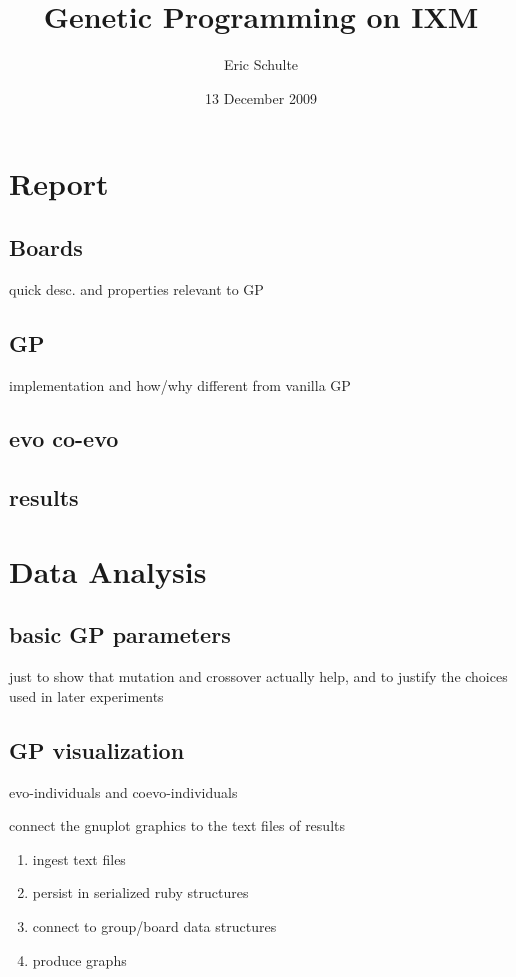 \documentclass[11pt]{article}
\title{Genetic Programming on IXM}
\author{Eric Schulte}
\date{13 December 2009}
\begin{document}
\maketitle


\section*{Report}
\label{sec-1}
\subsection*{Boards}
\label{sec-1.1}

quick desc. and properties relevant to GP
\subsection*{GP}
\label{sec-1.2}

implementation and how/why different from vanilla GP
\subsection*{evo co-evo}
\label{sec-1.3}
\subsection*{results}
\label{sec-1.4}
\section*{Data Analysis}
\label{sec-2}
\subsection*{basic GP parameters}
\label{sec-2.1}

just to show that mutation and crossover actually help, and to justify
the choices used in later experiments
\subsection*{GP visualization}
\label{sec-2.2}

evo-individuals and coevo-individuals

connect the gnuplot graphics to the text files of results

\begin{enumerate}
\item ingest text files
\item persist in serialized ruby structures
\item connect to group/board data structures
\item produce graphs
\end{enumerate}
\end{document}
